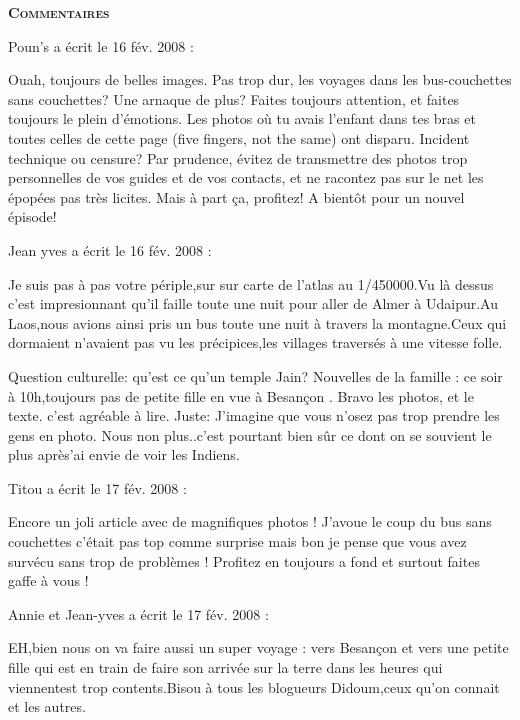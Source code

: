 \bigskip
\textbf{\textsc{Commentaires}}

\medskip
Poun's a écrit le 16 fév. 2008 :
\begin{displayquote}
Ouah, toujours de belles images. Pas trop dur, les voyages dans les bus-couchettes sans couchettes?
Une arnaque de plus? Faites toujours attention, et faites toujours le plein d'émotions.
Les photos où tu avais l'enfant dans tes bras et toutes celles de cette page (five fingers, not the same) ont disparu. Incident technique ou censure?
Par prudence, évitez de transmettre des photos trop personnelles de vos guides et de vos contacts, et ne racontez pas sur le net les épopées pas très licites.
Mais à part ça, profitez!
A bientôt pour un nouvel épisode!
\end{displayquote}

\medskip
Jean yves a écrit le 16 fév. 2008 :
\begin{displayquote}
Je suis pas à pas votre périple,sur sur carte de l'atlas au 1/450000.Vu là dessus c'est impresionnant qu'il faille toute une nuit pour aller de Almer à Udaipur.Au Laos,nous avions ainsi pris un bus toute une nuit à travers la montagne.Ceux qui dormaient n'avaient pas vu les précipices,les villages traversés à une vitesse folle.

Question culturelle: qu'est ce qu'un temple Jain?
Nouvelles de la famille : ce soir à 10h,toujours pas de petite fille en vue à Besançon .
Bravo les photos, et le texte. c'est agréable à lire.
Juste: J'imagine que vous n'osez pas trop prendre les gens en photo. Nous non plus..c'est pourtant bien sûr ce dont on se souvient le plus après\dotsJ'ai envie de voir les Indiens.
\end{displayquote}

\medskip
Titou a écrit le 17 fév. 2008 :
\begin{displayquote}
Encore un joli article avec de magnifiques photos ! J'avoue le coup du bus sans couchettes c'était pas top comme surprise mais bon je pense que vous avez survécu sans trop de problèmes ! Profitez en toujours a fond et surtout faites gaffe à vous !
\end{displayquote}

\medskip
Annie et Jean-yves a écrit le 17 fév. 2008 :
\begin{displayquote}
EH,bien nous on va faire aussi un super voyage :
vers Besançon et vers une petite fille qui est en train de faire son arrivée sur la terre dans les heures qui viennent\dotsOn est trop contents.Bisou à tous les blogueurs Didoum,ceux qu'on connait et les autres.
\end{displayquote}

